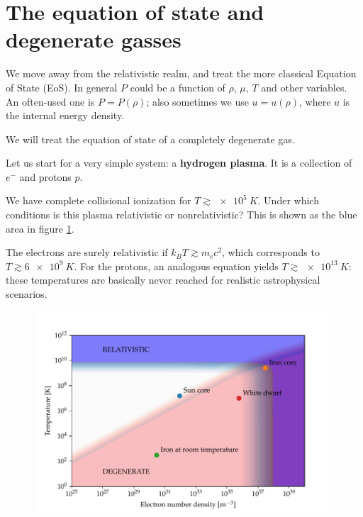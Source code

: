 \documentclass[main.tex]{subfiles}
\begin{document}
\section{The equation of state and degenerate gasses}




We move away from the relativistic realm, and treat the more classical Equation of State (EoS). 
In general \(P\) could be a function of \(\rho \), \(\mu \), \(T\) and other variables. 
An often-used one is \(P = P (\rho )\); also sometimes we use \(u = u(\rho )\), where \(u\) is the internal energy density. 

We will treat the equation of state of a completely degenerate gas. 

Let us start for a very simple system: a \textbf{hydrogen plasma}. 
It is a collection of \(e^{-}\) and protons \(p\). 

We have complete collisional ionization for \(T \gtrsim \SI{e5}{K}\). 
Under which conditions is this plasma relativistic or nonrelativistic? This is shown as the blue area in figure \ref{fig:relativisticity_degeneracy}.

The electrons are surely relativistic if \(k_B T \gtrsim m_e c^2\), which corresponds to \(T \gtrsim \SI{6e9}{K}\). 
For the protons, an analogous equation yields \(T \gtrsim \SI{e13}{K}\): these temperatures are basically never reached for realistic astrophysical scenarios. 

\begin{figure}[ht]
\centering
\includegraphics[width=\textwidth]{figures/relativisticity_degeneracy.pdf}
\caption{}
\label{fig:relativisticity_degeneracy}
\end{figure}
\end{document}
